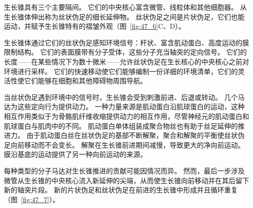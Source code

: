 生长锥具有三个主要隔间。
它们的中央核心富含微管、线粒体和其他细胞器。
从生长锥体伸出称为丝状伪足的细长延伸物。
丝状伪足之间是片状伪足，它们也能运动，并赋予生长锥特有的褶皱外观（图~\ref{fig:47_6}C、D）。


生长锥体通过它们的丝状伪足感知环境信号：杆状、富含肌动蛋白、高度运动的膜限制结构。
它们的表面膜带有分子受体，这些分子充当轴突的定向信号。
它们的长度——在某些情况下为数十微米——允许丝状伪足在生长核心的中央核心之前对环境进行采样。
它们的快速移动使它们能够编制一份详细的环境清单，它们的灵活性使它们能够在细胞和其他障碍物周围导航。


当丝状伪足遇到环境中的信号时，生长锥会受到刺激前进、后退或转动。
几个马达为这些定向行为提供动力。
一种力量来源是肌动蛋白沿肌球蛋白的运动，这种相互作用类似于为骨骼肌纤维收缩提供动力的相互作用，尽管神经元的肌动蛋白和肌球蛋白与肌肉中的不同。
肌动蛋白单体组装成聚合物丝也有助于丝足延伸的推进力。
由于肌动蛋白丝在丝状伪足的基部不断解聚，聚合和解聚的平衡使丝状伪足向前移动而不会变长。
解聚在生长锥前进期间减慢，导致更大的净向前运动。
膜沿基底的运动提供了另一种向前运动的来源。


每种类型的分子马达对生长锥推进的贡献可能因情况而异。
然而，最后一步涉及微管从生长锥的中央核心流入新延伸的尖端，从而使生长锥向前移动并在其后留下新的轴突片段。
新的片状伪足和丝状伪足在前进的生长锥中形成并且循环重复（图~\ref{fig:47_7}）。


